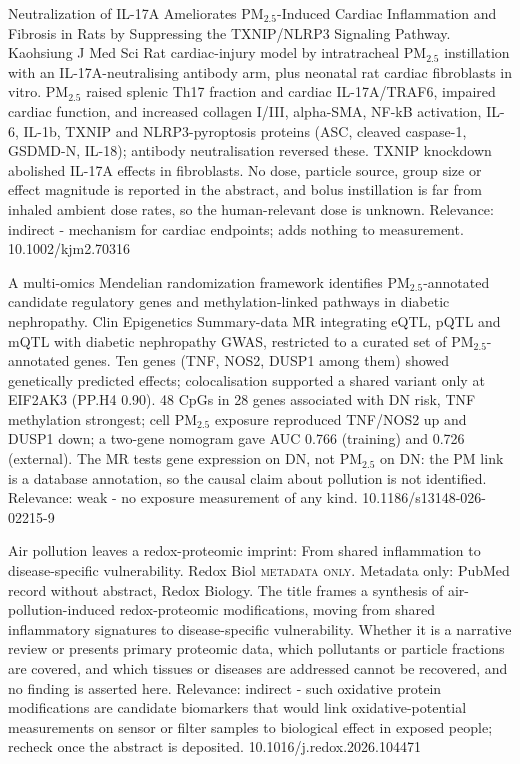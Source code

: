 \documentclass[10pt]{article}
\begin{document}
\par{}\baselineskip{}\baselineskip
{}

{Neutralization of IL-17A Ameliorates PM$_{2.5}$-Induced Cardiac Inflammation and Fibrosis in Rats by Suppressing the TXNIP/NLRP3 Signaling Pathway.}
{Kaohsiung J Med Sci}
{Rat cardiac-injury model by intratracheal PM$_{2.5}$ instillation with an IL-17A-neutralising antibody arm, plus neonatal rat cardiac fibroblasts in vitro. PM$_{2.5}$ raised splenic Th17 fraction and cardiac IL-17A/TRAF6, impaired cardiac function, and increased collagen I/III, alpha-SMA, NF-kB activation, IL-6, IL-1b, TXNIP and NLRP3-pyroptosis proteins (ASC, cleaved caspase-1, GSDMD-N, IL-18); antibody neutralisation reversed these. TXNIP knockdown abolished IL-17A effects in fibroblasts. No dose, particle source, group size or effect magnitude is reported in the abstract, and bolus instillation is far from inhaled ambient dose rates, so the human-relevant dose is unknown. Relevance: indirect - mechanism for cardiac endpoints; adds nothing to measurement.}
{10.1002/kjm2.70316}

{A multi-omics Mendelian randomization framework identifies PM$_{2.5}$-annotated candidate regulatory genes and methylation-linked pathways in diabetic nephropathy.}
{Clin Epigenetics}
{Summary-data MR integrating eQTL, pQTL and mQTL with diabetic nephropathy GWAS, restricted to a curated set of PM$_{2.5}$-annotated genes. Ten genes (TNF, NOS2, DUSP1 among them) showed genetically predicted effects; colocalisation supported a shared variant only at EIF2AK3 (PP.H4 0.90). 48 CpGs in 28 genes associated with DN risk, TNF methylation strongest; cell PM$_{2.5}$ exposure reproduced TNF/NOS2 up and DUSP1 down; a two-gene nomogram gave AUC 0.766 (training) and 0.726 (external). The MR tests gene expression on DN, not PM$_{2.5}$ on DN: the PM link is a database annotation, so the causal claim about pollution is not identified. Relevance: weak - no exposure measurement of any kind.}
{10.1186/s13148-026-02215-9}

{Air pollution leaves a redox-proteomic imprint: From shared inflammation to disease-specific vulnerability.}
{Redox Biol}
{\textsc{metadata only.} Metadata only: PubMed record without abstract, Redox Biology. The title frames a synthesis of air-pollution-induced redox-proteomic modifications, moving from shared inflammatory signatures to disease-specific vulnerability. Whether it is a narrative review or presents primary proteomic data, which pollutants or particle fractions are covered, and which tissues or diseases are addressed cannot be recovered, and no finding is asserted here. Relevance: indirect - such oxidative protein modifications are candidate biomarkers that would link oxidative-potential measurements on sensor or filter samples to biological effect in exposed people; recheck once the abstract is deposited.}
{10.1016/j.redox.2026.104471}
\end{document}
